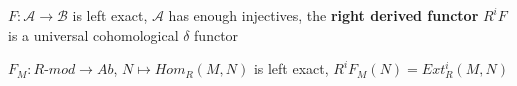 \documentclass[../main.tex]{subfiles}
\begin{document}
\begin{corollary}
$F:\mathscr A\to\mathscr B$ is left exact, $\mathscr A$ has enough injectives, the \textbf{right derived functor} $R^iF$ is a universal cohomological $\delta$ functor
\end{corollary}

\begin{example}
$F_M:R$-$mod\to Ab$, $N\mapsto Hom_R(M,N)$ is left exact, $R^iF_M(N)=Ext^i_R(M,N)$
\end{example}
\end{document}
